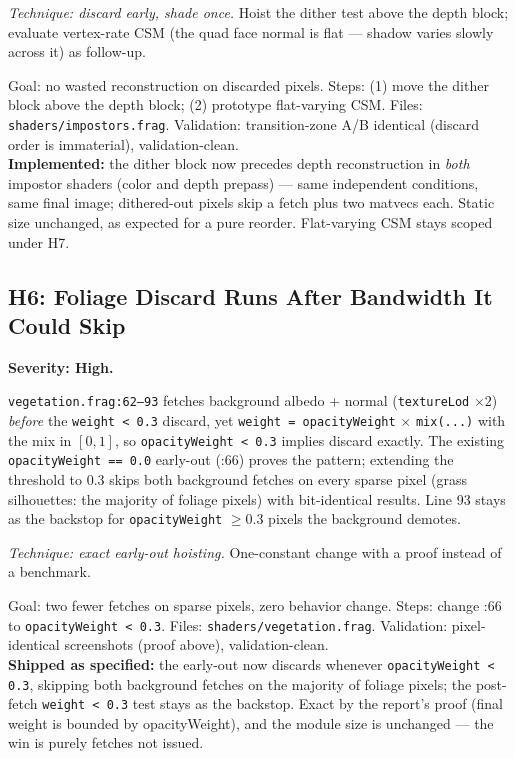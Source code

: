 \documentclass[11pt,a4paper]{article}
\begin{document}
\textit{Technique: discard early, shade once.} Hoist the dither test above
the depth block; evaluate vertex-rate CSM (the quad face normal is flat ---
shadow varies slowly across it) as follow-up.

\begin{tcolorbox}[promptbox={Prompt --- H5: cheapen the impostor fragment stage}]
Goal: no wasted reconstruction on discarded pixels. Steps: (1) move the
dither block above the depth block; (2) prototype flat-varying CSM.
Files: \texttt{shaders/impostors.frag}. Validation: transition-zone A/B
identical (discard order is immaterial), validation-clean.
\\ \textbf{Implemented:} the dither block now precedes depth reconstruction
in \emph{both} impostor shaders (color and depth prepass) --- same
independent conditions, same final image; dithered-out pixels skip a fetch
plus two matvecs each. Static size unchanged, as expected for a pure
reorder. Flat-varying CSM stays scoped under H7.
\end{tcolorbox}

\subsection{H6: Foliage Discard Runs After Bandwidth It Could Skip}
\label{sec:h6}

\textbf{Severity: High.}

\texttt{vegetation.frag:62--93} fetches background albedo + normal
(\texttt{textureLod} $\times 2$) \emph{before} the \texttt{weight < 0.3}
discard, yet \texttt{weight = opacityWeight} $\times$ \texttt{mix(...)}
with the mix in $[0,1]$, so \texttt{opacityWeight < 0.3} implies discard
exactly. The existing \texttt{opacityWeight == 0.0} early-out (:66) proves
the pattern; extending the threshold to $0.3$ skips both background fetches
on every sparse pixel (grass silhouettes: the majority of foliage pixels)
with bit-identical results. Line 93 stays as the backstop for
\texttt{opacityWeight} $\geq 0.3$ pixels the background demotes.

\textit{Technique: exact early-out hoisting.} One-constant change with a
proof instead of a benchmark.

\begin{tcolorbox}[promptbox={Prompt --- H6: hoist the foliage discard threshold}]
Goal: two fewer fetches on sparse pixels, zero behavior change. Steps:
change :66 to \texttt{opacityWeight < 0.3}. Files:
\texttt{shaders/vegetation.frag}. Validation: pixel-identical screenshots
(proof above), validation-clean.
\\ \textbf{Shipped as specified:} the early-out now discards whenever
\texttt{opacityWeight < 0.3}, skipping both background fetches on the
majority of foliage pixels; the post-fetch \texttt{weight < 0.3} test stays
as the backstop. Exact by the report's proof (final weight is bounded by
opacityWeight), and the module size is unchanged --- the win is purely
fetches not issued.
\end{tcolorbox}
\end{document}
